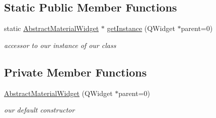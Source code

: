 \subsection*{Static Public Member Functions}
\begin{DoxyCompactItemize}
\item 
\hypertarget{class_abstract_material_widget_a96533d07fe6cc79527f5df9ddf2199a7}{static \hyperlink{class_abstract_material_widget}{Abstract\-Material\-Widget} $\ast$ \hyperlink{class_abstract_material_widget_a96533d07fe6cc79527f5df9ddf2199a7}{get\-Instance} (Q\-Widget $\ast$parent=0)}\label{class_abstract_material_widget_a96533d07fe6cc79527f5df9ddf2199a7}

\begin{DoxyCompactList}\small\item\em accessor to our instance of our class \end{DoxyCompactList}\end{DoxyCompactItemize}
\subsection*{Private Member Functions}
\begin{DoxyCompactItemize}
\item 
\hypertarget{class_abstract_material_widget_ace749c971293b2aef90e2861500be8bd}{\hyperlink{class_abstract_material_widget_ace749c971293b2aef90e2861500be8bd}{Abstract\-Material\-Widget} (Q\-Widget $\ast$parent=0)}\label{class_abstract_material_widget_ace749c971293b2aef90e2861500be8bd}

\begin{DoxyCompactList}\small\item\em our default constructor \end{DoxyCompactList}\end{DoxyCompactItemize}
